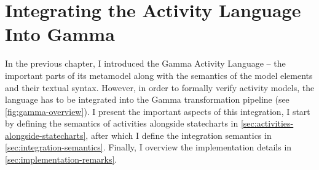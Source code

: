 \chapter{Integrating the Activity Language Into Gamma}\label{ch:activiy_verification}

In the previous chapter, I introduced the Gamma Activity Language -- the important parts of its metamodel along with the semantics of the model elements and their textual syntax. However, in order to formally verify activity models, the language has to be integrated into the Gamma transformation pipeline (see \autoref{fig:gamma-overview}). I present the important aspects of this integration, I start by defining the semantics of activities alongside statecharts in \autoref{sec:activities-alongside-statecharts}, after which I define the integration semantics in \autoref{sec:integration-semantics}. Finally, I overview the implementation details in \autoref{sec:implementation-remarks}. 




